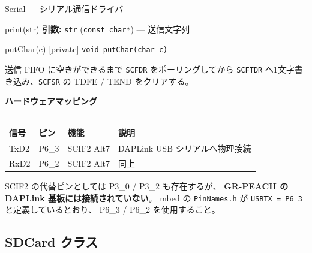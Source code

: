\documentclass[a4paper,11pt,dvipdfmx]{jsarticle}
\makeatletter
\newcommand{\apisection}[1]{%
  \par\addvspace{4mm}%
  {\normalsize\bfseries\color{headerblue} #1}%
  \par\vspace{-1mm}%
  {\color{accentblue!40}\rule{\linewidth}{0.5pt}}%
  \par\nobreak\vspace{2mm}%
  \@afterheading
}
\makeatother
\begin{document}
\begin{apibox}{Serial --- シリアル通信ドライバ}
\begin{funcblock}{print(str)}
\vspace{1.5mm}
\textbf{引数:} \texttt{str} (\texttt{const char*}) --- 送信文字列
\end{funcblock}

\begin{funcblock}{putChar(c) \normalfont\small\color{gray}[private]}
\texttt{void putChar(char c)}

\vspace{1.5mm}
送信 FIFO に空きができるまで \texttt{SCFDR} をポーリングしてから
\texttt{SCFTDR} へ1文字書き込み、\texttt{SCFSR} の TDFE / TEND をクリアする。
\end{funcblock}

\apisection{ハードウェアマッピング}

\begin{tabularx}{\textwidth}{l l l X}
\toprule
\textbf{信号} & \textbf{ピン} & \textbf{機能} & \textbf{説明} \\
\midrule
TxD2 & P6\_3 & SCIF2 Alt7 & DAPLink USB シリアルへ物理接続 \\
RxD2 & P6\_2 & SCIF2 Alt7 & 同上 \\
\bottomrule
\end{tabularx}

\begin{notebox}[ピン選択の根拠]
SCIF2 の代替ピンとしては P3\_0 / P3\_2 も存在するが、
\textbf{GR-PEACH の DAPLink 基板には接続されていない}。
mbed の \texttt{PinNames.h} が \texttt{USBTX = P6\_3} と定義しているとおり、
P6\_3 / P6\_2 を使用すること。
\end{notebox}

\end{apibox}

\subsection{SDCard クラス}\label{sec:api-sdcard}
\end{document}
